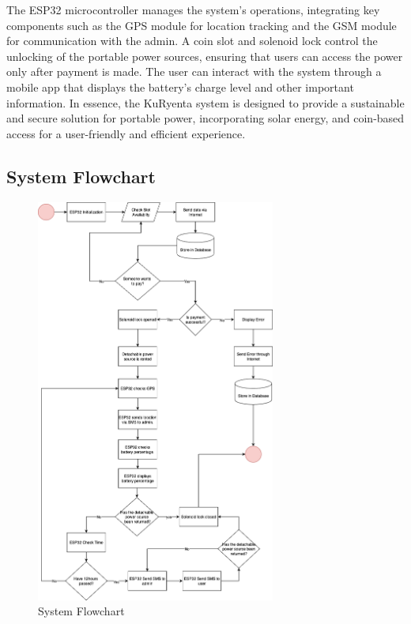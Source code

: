 {The ESP32 microcontroller manages the system's operations, integrating key components such as the GPS module for location tracking and the GSM module for communication with the admin. A coin slot and solenoid lock control the unlocking of the portable power sources, ensuring that users can access the power only after payment is made. The user can interact with the system through a mobile app that displays the battery's charge level and other important information. In essence, the KuRyenta system is designed to provide a sustainable and secure solution for portable power, incorporating solar energy, and coin-based access for a user-friendly and efficient experience.


\subsection{System  Flowchart}
\begin{figure}[H]
	\centering
	\caption{System Flowchart}
	\label{fig:flowchart}
	\includegraphics[width=0.7\textwidth]{figures/flowchart.png}
\end{figure}

}
